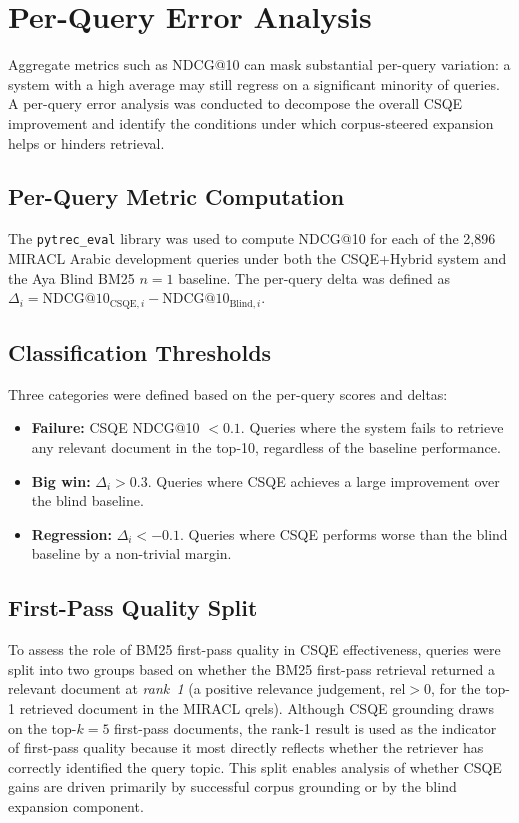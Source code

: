 \section{Per-Query Error Analysis}
\label{sec:meth_error_csqe}

Aggregate metrics such as NDCG@10 can mask substantial per-query variation: a system with a high average may still regress on a significant minority of queries. A per-query error analysis was conducted to decompose the overall CSQE improvement and identify the conditions under which corpus-steered expansion helps or hinders retrieval.

\subsection{Per-Query Metric Computation}
The \texttt{pytrec\_eval} library was used to compute NDCG@10 for each of the 2,896 MIRACL Arabic development queries under both the CSQE+Hybrid system and the Aya Blind BM25 $n=1$ baseline. The per-query delta was defined as $\Delta_i = \text{NDCG@10}_{\text{CSQE},i} - \text{NDCG@10}_{\text{Blind},i}$.

\subsection{Classification Thresholds}
Three categories were defined based on the per-query scores and deltas:

\begin{itemize}
    \item \textbf{Failure:} CSQE NDCG@10 $< 0.1$. Queries where the system fails to retrieve any relevant document in the top-10, regardless of the baseline performance.
    \item \textbf{Big win:} $\Delta_i > 0.3$. Queries where CSQE achieves a large improvement over the blind baseline.
    \item \textbf{Regression:} $\Delta_i < -0.1$. Queries where CSQE performs worse than the blind baseline by a non-trivial margin.
\end{itemize}

\subsection{First-Pass Quality Split}
To assess the role of BM25 first-pass quality in CSQE effectiveness, queries were split into two groups based on whether the BM25 first-pass retrieval returned a relevant document at \emph{rank~1} (a positive relevance judgement, $\text{rel} > 0$, for the top-1 retrieved document in the MIRACL qrels). Although CSQE grounding draws on the top-$k=5$ first-pass documents, the rank-1 result is used as the indicator of first-pass quality because it most directly reflects whether the retriever has correctly identified the query topic. This split enables analysis of whether CSQE gains are driven primarily by successful corpus grounding or by the blind expansion component.

